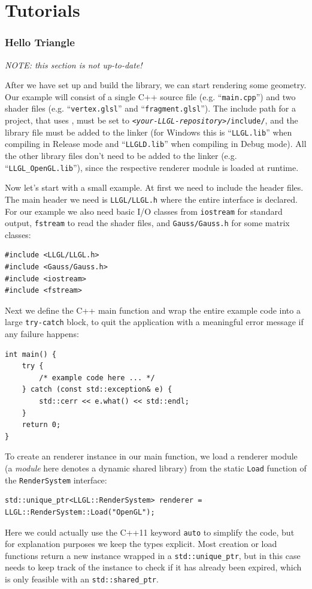 \documentclass{article}
\begin{document}
\newpage
\part{Tutorials}

\section{Hello Triangle}

\textit{NOTE: this section is not up-to-date!} \\
\noindent

After we have set up and build the library, we can start rendering some geometry.
Our example will consist of a single C++ source file (e.g. ``\texttt{main.cpp}'') and two shader files
(e.g. ``\texttt{vertex.glsl}'' and ``\texttt{fragment.glsl}'').
The include path for a project, that uses \LLGL, must be set to \texttt{\textit{<your-LLGL-repository>}/include/},
and the \LLGL library file must be added to the linker (for Windows this is ``\texttt{LLGL.lib}''
when compiling in Release mode and ``\texttt{LLGLD.lib}'' when compiling in Debug mode).
All the other library files don't need to be added to the linker (e.g. ``\texttt{LLGL\_OpenGL.lib}''),
since the respective renderer module is loaded at runtime.

Now let's start with a small example. At first we need to include the header files.
The main header we need is \texttt{LLGL/LLGL.h} where the entire \LLGL interface is declared.
For our example we also need basic I/O classes from \texttt{iostream} for standard output, \texttt{fstream}
to read the shader files, and \texttt{Gauss/Gauss.h} for some matrix classes:
\begin{lstlisting}
#include <LLGL/LLGL.h>
#include <Gauss/Gauss.h>
#include <iostream>
#include <fstream>
\end{lstlisting}
Next we define the C++ main function and wrap the entire example code into a large \texttt{try-catch} block,
to quit the application with a meaningful error message if any failure happens:
\begin{lstlisting}
int main() {
    try {
        /* example code here ... */
    } catch (const std::exception& e) {
        std::cerr << e.what() << std::endl;
    }
    return 0;
}
\end{lstlisting}
To create an \LLGL renderer instance in our main function, we load a renderer module
(a \textit{module} here denotes a dynamic shared library)
from the static \texttt{Load} function of the \texttt{RenderSystem} interface:
\begin{lstlisting}
std::unique_ptr<LLGL::RenderSystem> renderer = LLGL::RenderSystem::Load("OpenGL");
\end{lstlisting}
Here we could actually use the C++11 keyword \texttt{auto} to simplify the code,
but for explanation purposes we keep the types explicit.
Most creation or load functions return a new instance wrapped in a \texttt{std::unique\_ptr},
but in this case \LLGL needs to keep track of the instance to check if it has already been expired,
which is only feasible with an \texttt{std::shared\_ptr}.
\end{document}
